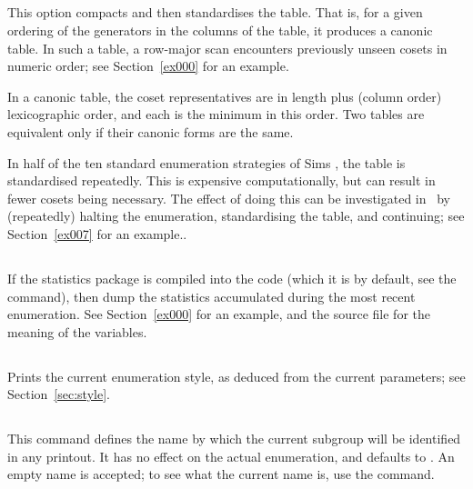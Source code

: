 \subsection{}

This option compacts and then standardises the table.
That is, for a given ordering of the generators in the columns of the
  table, it produces a canonic table.
In such a table, a row-major scan encounters previously unseen cosets in
  numeric order; see Section~\ref{ex000} for an example.

In a canonic table, the coset representatives are in length plus (column
  order) lexicographic order, and each is the minimum in this order.
Two tables are equivalent only if their canonic forms are the same.

In half of the ten standard enumeration strategies of Sims \cite{Sim}, the
  table is standardised repeatedly.
This is expensive computationally, but can result in fewer cosets being
  necessary.
The effect of doing this can be investigated in \ace\ by (repeatedly)
  halting the enumeration, standardising the table, and continuing; see 
  Section~\ref{ex007} for an example..

\subsection{}

If the statistics package is compiled into the code (which it is by
  default, see the  command), then dump the statistics
  accumulated during the most recent enumeration.
See Section~\ref{ex000} for an example, and the  source file
  for the meaning of the variables.

\subsection{}

Prints the current enumeration style, as deduced from the current 
  \amp {} parameters; see Section~\ref{sec:style}.

\subsection{}

This command defines the name by which the current subgroup will be
  identified in any printout.
It has no effect on the actual enumeration, and defaults to .
An empty name is accepted; to see what the current name is, use the
   command.

